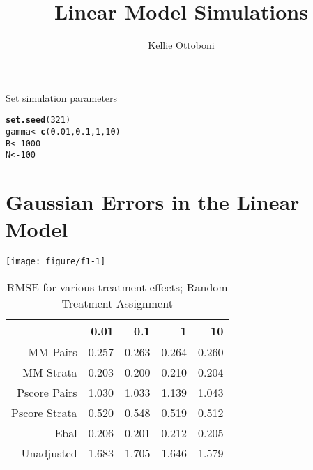 \documentclass[11pt]{article}\usepackage[]{graphicx}\usepackage[]{color}
\title{Linear Model Simulations}
\author{Kellie Ottoboni}
\makeatletter
\def\maxwidth{ %
  \ifdim\Gin@nat@width>\linewidth
    \linewidth
  \else
    \Gin@nat@width
  \fi
}
\newcommand{\hlnum}[1]{\textcolor[rgb]{0.686,0.059,0.569}{#1}}%
\newcommand{\hlstd}[1]{\textcolor[rgb]{0.345,0.345,0.345}{#1}}%
\newcommand{\hlkwb}[1]{\textcolor[rgb]{0.69,0.353,0.396}{#1}}%
\newcommand{\hlkwd}[1]{\textcolor[rgb]{0.737,0.353,0.396}{\textbf{#1}}}%
\newenvironment{kframe}{%
 \def\at@end@of@kframe{}%
 \ifinner\ifhmode%
  \def\at@end@of@kframe{\end{minipage}}%
  \begin{minipage}{\columnwidth}%
 \fi\fi%
 \def\FrameCommand##1{\hskip\@totalleftmargin \hskip-\fboxsep
 \colorbox{shadecolor}{##1}\hskip-\fboxsep
     \hskip-\linewidth \hskip-\@totalleftmargin \hskip\columnwidth}%
 \MakeFramed {\advance\hsize-\width
   \@totalleftmargin\z@ \linewidth\hsize
   \@setminipage}}%
 {\par\unskip\endMakeFramed%
 \at@end@of@kframe}
\newenvironment{knitrout}{}{} %
\makeatother
\begin{document}
\maketitle


Set simulation parameters
\begin{knitrout}
\color{fgcolor}\begin{kframe}
\begin{alltt}
\hlkwd{set.seed}\hlstd{(}\hlnum{321}\hlstd{)}
\hlstd{gamma} \hlkwb{<-} \hlkwd{c}\hlstd{(}\hlnum{0.01}\hlstd{,} \hlnum{0.1}\hlstd{,} \hlnum{1}\hlstd{,} \hlnum{10}\hlstd{)}
\hlstd{B} \hlkwb{<-} \hlnum{1000}
\hlstd{N} \hlkwb{<-} \hlnum{100}
\end{alltt}
\end{kframe}
\end{knitrout}

\section{Gaussian Errors in the Linear Model}
\begin{knitrout}
\color{fgcolor}

{\centering \texttt{[image: figure/f1-1]} 

}



\end{knitrout}
\begin{table}[ht]
\centering
\begin{tabular}{rrrrr}
  \hline
 & 0.01 & 0.1 & 1 & 10 \\ 
  \hline
MM Pairs & 0.257 & 0.263 & 0.264 & 0.260 \\ 
  MM Strata & 0.203 & 0.200 & 0.210 & 0.204 \\ 
  Pscore Pairs & 1.030 & 1.033 & 1.139 & 1.043 \\ 
  Pscore Strata & 0.520 & 0.548 & 0.519 & 0.512 \\ 
  Ebal & 0.206 & 0.201 & 0.212 & 0.205 \\ 
  Unadjusted & 1.683 & 1.705 & 1.646 & 1.579 \\ 
   \hline
\end{tabular}
\caption{RMSE for various treatment effects; Random Treatment Assignment} 
\label{tab:f1}
\end{table}
\end{document}
